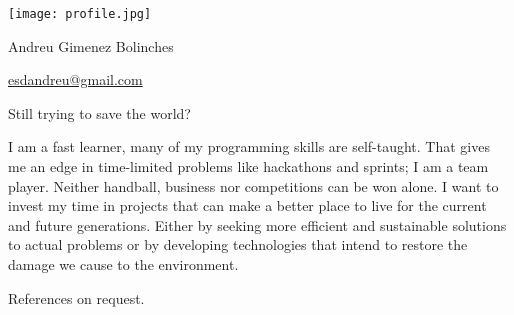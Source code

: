 \documentclass[]{infinity-cv}
\begin{document}
\begingroup
\hypersetup{ hidelinks, pdfnewwindow}
\begin{minipage}{0.15\textwidth} %
    \texttt{[image: profile.jpg]}
\end{minipage}
\hfill
\begin{minipage}{0.6\textwidth}
    \centering
    {\Huge\color{heading}Andreu Gimenez Bolinches}
    
    \medskip
    
    \href{mailto:esdandreu@gmail.com}{
        \faEnvelope\hspace{1pt} esdandreu@gmail.com
    } \hfill
    \href{https://www.linkedin.com/in/andreu-gimenez-bolinches-esdandreu/}{
        \faLinkedin
    } \hfill
    \href{https://esdandreu.github.io/}{\faGlobe} \hfill
    \href{https://stackoverflow.com/users/13180090/andreu-gimenez}{
        \faStackOverflow
    } \hfill
    \href{https://github.com/esdandreu}{\faGithub} \hfill
    \href{https://gitlab.com/esdandreu}{\faGitlab} \hfill
    
    \medskip \medskip
    Still trying to save the world?
\end{minipage}
\hfill
\begin{minipage}{0.15\textwidth}
\end{minipage}
\medskip
\endgroup

\medskip
I am a fast learner, many of my programming skills are self-taught. That gives
me an edge in time-limited problems like hackathons and sprints; I am a team
player. Neither handball, business nor competitions can be won alone. I want to
invest my time in projects that can make a better place to live for the current
and future generations. Either by seeking more efficient and sustainable
solutions to actual problems or by developing technologies that intend to
restore the damage we cause to the environment.



\medskip

\begin{minipage}{0.45\textwidth}
    
    
\end{minipage}
\hfill
\begin{minipage}{0.5\textwidth}
    
\end{minipage}

\vfill
\centering
References on request.
\end{document}
